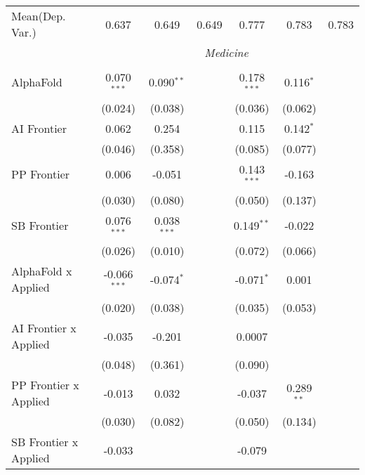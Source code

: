 \begin{tabular}{lcccccc}
Mean(Dep. Var.) & 0.637 & 0.649 & 0.649 & 0.777 & 0.783 & 0.783 \\
 & \multicolumn{6}{c}{\textit{Medicine}} \\ \\
   AlphaFold                      & 0.070$^{***}$  & 0.090$^{**}$  &                & 0.178$^{***}$ & 0.116$^{*}$  &   \\   
                                  & (0.024)        & (0.038)       &                & (0.036)       & (0.062)      &   \\   
   AI Frontier                    & 0.062          & 0.254         &                & 0.115         & 0.142$^{*}$  &   \\   
                                  & (0.046)        & (0.358)       &                & (0.085)       & (0.077)      &   \\   
   PP Frontier                    & 0.006          & -0.051        &                & 0.143$^{***}$ & -0.163       &   \\   
                                  & (0.030)        & (0.080)       &                & (0.050)       & (0.137)      &   \\   
   SB Frontier                    & 0.076$^{***}$  & 0.038$^{***}$ &                & 0.149$^{**}$  & -0.022       &   \\   
                                  & (0.026)        & (0.010)       &                & (0.072)       & (0.066)      &   \\   
   AlphaFold x Applied            & -0.066$^{***}$ & -0.074$^{*}$  &                & -0.071$^{*}$  & 0.001        &   \\   
                                  & (0.020)        & (0.038)       &                & (0.035)       & (0.053)      &   \\   
   AI Frontier x Applied          & -0.035         & -0.201        &                & 0.0007        &              &   \\   
                                  & (0.048)        & (0.361)       &                & (0.090)       &              &   \\   
   PP Frontier x Applied          & -0.013         & 0.032         &                & -0.037        & 0.289$^{**}$ &   \\   
                                  & (0.030)        & (0.082)       &                & (0.050)       & (0.134)      &   \\   
   SB Frontier x Applied          & -0.033         &               &                & -0.079        &              &   \\   

\end{tabular}

